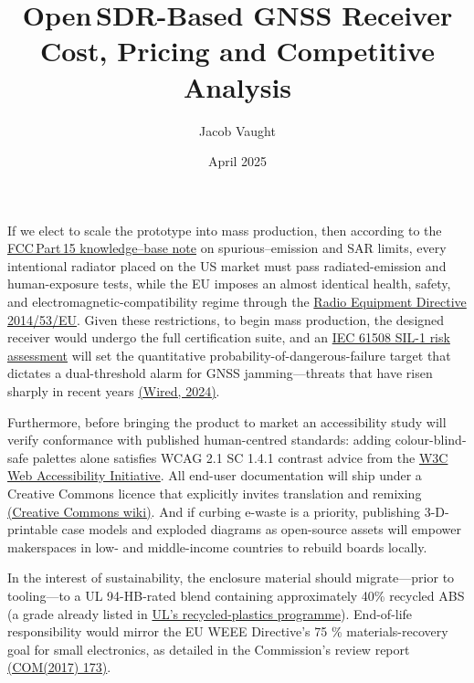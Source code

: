 \documentclass{article}
\title{Open\,SDR-Based GNSS Receiver\\Cost, Pricing and Competitive Analysis}
\author{Jacob Vaught}
\date{April 2025}
\begin{document}
\maketitle


If we elect to scale the prototype into mass production, then according to the 
\href{https://apps.fcc.gov/oetcf/kdb/forms/FTSSearchResultPage.cfm?id=20413&switch=P}{FCC\,Part\,15 knowledge–base note} on spurious–emission and SAR limits, every intentional radiator placed on the US market must pass radiated-emission and human-exposure tests, while the EU imposes an almost identical health, safety, and electromagnetic-compatibility regime through the 
\href{https://eur-lex.europa.eu/eli/dir/2014/53/oj/eng}{Radio Equipment Directive 2014/53/EU}.  Given these restrictions, to begin mass production, the designed receiver would undergo the full certification suite, and an 
\href{https://iec.ch/functional-safety/faq}{IEC 61508 SIL-1 risk assessment} will set the quantitative probability-of-dangerous-failure target that dictates a dual-threshold alarm for GNSS jamming—threats that have risen sharply in recent years \href{https://www.wired.com/story/the-dangerous-rise-of-gps-attacks/}{(Wired, 2024)}.

Furthermore, before bringing the product to market an accessibility study will verify conformance with published human-centred standards: adding colour-blind-safe palettes alone satisfies WCAG 2.1 SC 1.4.1 contrast advice from the 
\href{https://www.w3.org/WAI/WCAG21/Understanding/use-of-color.html}{W3C Web Accessibility Initiative}.  All end-user documentation will ship under a Creative Commons licence that explicitly invites translation and remixing \href{https://wiki.creativecommons.org/wiki/Translate/Documentation}{(Creative Commons wiki)}.  And if curbing e-waste is a priority, publishing 3-D-printable case models and exploded diagrams as open-source assets will empower makerspaces in low- and middle-income countries to rebuild boards locally.

In the interest of sustainability, the enclosure material should migrate—prior to tooling—to a UL 94-HB-rated blend containing approximately 40\% recycled ABS (a grade already listed in 
\href{https://www.ul.com/services/combustion-fire-tests-plastics}{UL’s recycled-plastics programme}).  End-of-life responsibility would mirror the EU WEEE Directive’s 75 \% materials-recovery goal for small electronics, as detailed in the Commission’s review report \href{https://eur-lex.europa.eu/legal-content/EN/TXT/PDF/?uri=CELEX%3A52017DC0173}{(COM(2017) 173)}.
\end{document}
